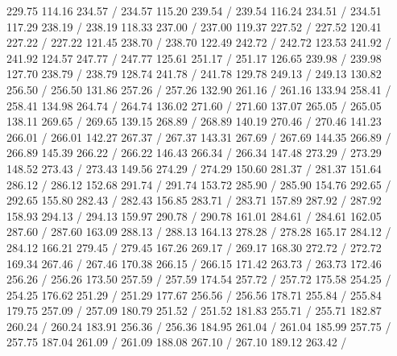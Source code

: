{ 229.75 114.16 234.57 /
 234.57 115.20 239.54 /
 239.54 116.24 234.51 /
 234.51 117.29 238.19 /
 238.19 118.33 237.00 /
 237.00 119.37 227.52 /
 227.52 120.41 227.22 /
 227.22 121.45 238.70 /
 238.70 122.49 242.72 /
 242.72 123.53 241.92 /
 241.92 124.57 247.77 /
 247.77 125.61 251.17 /
 251.17 126.65 239.98 /
 239.98 127.70 238.79 /
 238.79 128.74 241.78 /
 241.78 129.78 249.13 /
 249.13 130.82 256.50 /
 256.50 131.86 257.26 /
 257.26 132.90 261.16 /
 261.16 133.94 258.41 /
 258.41 134.98 264.74 /
 264.74 136.02 271.60 /
 271.60 137.07 265.05 /
 265.05 138.11 269.65 /
 269.65 139.15 268.89 /
 268.89 140.19 270.46 /
 270.46 141.23 266.01 /
 266.01 142.27 267.37 /
 267.37 143.31 267.69 /
 267.69 144.35 266.89 /
 266.89 145.39 266.22 /
 266.22 146.43 266.34 /
 266.34 147.48 273.29 /
 273.29 148.52 273.43 /
 273.43 149.56 274.29 /
 274.29 150.60 281.37 /
 281.37 151.64 286.12 /
 286.12 152.68 291.74 /
 291.74 153.72 285.90 /
 285.90 154.76 292.65 /
 292.65 155.80 282.43 /
 282.43 156.85 283.71 /
 283.71 157.89 287.92 /
 287.92 158.93 294.13 /
 294.13 159.97 290.78 /
 290.78 161.01 284.61 /
 284.61 162.05 287.60 /
 287.60 163.09 288.13 /
 288.13 164.13 278.28 /
 278.28 165.17 284.12 /
 284.12 166.21 279.45 /
 279.45 167.26 269.17 /
 269.17 168.30 272.72 /
 272.72 169.34 267.46 /
 267.46 170.38 266.15 /
 266.15 171.42 263.73 /
 263.73 172.46 256.26 /
 256.26 173.50 257.59 /
 257.59 174.54 257.72 /
 257.72 175.58 254.25 /
 254.25 176.62 251.29 /
 251.29 177.67 256.56 /
 256.56 178.71 255.84 /
 255.84 179.75 257.09 /
 257.09 180.79 251.52 /
 251.52 181.83 255.71 /
 255.71 182.87 260.24 /
 260.24 183.91 256.36 /
 256.36 184.95 261.04 /
 261.04 185.99 257.75 /
 257.75 187.04 261.09 /
 261.09 188.08 267.10 /
 267.10 189.12 263.42 /
}
